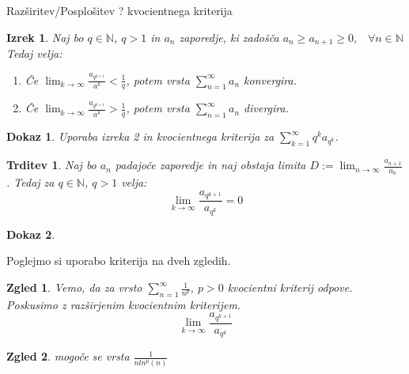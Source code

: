 \documentclass{beamer}
\newtheorem{izrek}{Izrek}
\newtheorem{trditev}{Trditev}
\newtheorem{zgled}{Zgled}
\newtheorem{dokaz}{Dokaz}
\begin{document}
\begin{frame}{Razširitev/Posplošitev ? kvocientnega kriterija}
    \begin{izrek}
        Naj bo $q \in {\mathbb{N}}$, $q > 1$ in ${a_n}$ zaporedje,
        ki zadošča $a_{n} \geq a_{n+1} \geq 0 \text{,} \quad \forall n \in {\mathbb{N}}$
        Tedaj velja:
        \pause

        \begin{enumerate}
            \item Če $\lim_{k \to \infty}{\frac{a_{q^{k + 1}}}{a^k}} < \frac{1}{q}$,
            potem vrsta $\sum_{n = 1}^{\infty}{a_n}$ konvergira.
            \item Če $\lim_{k \to \infty}{\frac{a_{q^{k + 1}}}{a^k}} > \frac{1}{q}$,
            potem vrsta $\sum_{n = 1}^{\infty}{a_n}$ divergira.
        \end{enumerate}
    \end{izrek}
    
    \pause
    \begin{dokaz}
        Uporaba izreka 2 in kvocientnega kriterija za $\sum_{k = 1}^{\infty}{q^ka_{q^k}}$.
    \end{dokaz}
\end{frame}
\begin{frame}
    \begin{trditev}
        Naj bo $a_{n}$ padajoče zaporedje in naj obstaja limita
        $D := \lim_{n \to \infty}{\frac{a_{n + 1}}{a_n}}$. Tedaj za $q \in {\mathbb{N}}$, $q > 1$ velja:
        \[
            \lim_{k \to \infty}{\frac{a_{q^{k + 1}}}{a_{q^k}}} = 0
        \]

    \end{trditev}
    
\end{frame}

\begin{frame}
    \begin{dokaz}
    \end{dokaz}
\end{frame}

\begin{frame}
    Poglejmo si uporabo kriterija na dveh zgledih.
    \begin{zgled}
        Vemo, da za vrsto 
        $\sum_{n = 1}^{\infty}{\frac{1}{n^p}}$, $p > 0$
        kvocientni kriterij odpove.
        Poskusimo z razširjenim kvocientnim kriterijem.
        \[
            \lim_{k \to \infty}{\frac{a_{q^{k + 1}}}{a_{q^k}}}
        \]

    \end{zgled}
    \begin{zgled}
        mogoče se vrsta $\frac{1}{nln^p(n)}$
    \end{zgled}
\end{frame}

\end{document}
